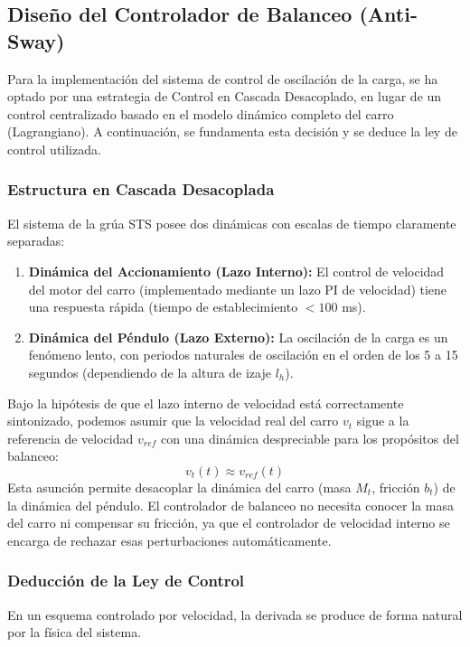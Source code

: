 \documentclass[11pt]{article}                                    %
\begin{document}
\subsection{Diseño del Controlador de Balanceo (Anti-Sway)}
Para la implementación del sistema de control de oscilación de la carga, se ha optado por una estrategia de Control en Cascada Desacoplado, en lugar de un control centralizado basado en el modelo dinámico completo del carro (Lagrangiano). A continuación, se fundamenta esta decisión y se deduce la ley de control utilizada.

\subsubsection{Estructura en Cascada Desacoplada}
El sistema de la grúa STS posee dos dinámicas con escalas de tiempo claramente separadas:
\begin{enumerate}
    \item \textbf{Dinámica del Accionamiento (Lazo Interno):} El control de velocidad del motor del carro (implementado mediante un lazo PI de velocidad) tiene una respuesta rápida (tiempo de establecimiento $< 100$ ms).
    \item \textbf{Dinámica del Péndulo (Lazo Externo):} La oscilación de la carga es un fenómeno lento, con periodos naturales de oscilación en el orden de los 5 a 15 segundos (dependiendo de la altura de izaje $l_h$).
\end{enumerate}

Bajo la hipótesis de que el lazo interno de velocidad está correctamente sintonizado, podemos asumir que la velocidad real del carro $v_t$ sigue a la referencia de velocidad $v_{ref}$ con una dinámica despreciable para los propósitos del balanceo:
\begin{equation}
    v_t(t) \approx v_{ref}(t)
\end{equation}
Esta asunción permite desacoplar la dinámica del carro (masa $M_t$, fricción $b_t$) de la dinámica del péndulo. El controlador de balanceo no necesita conocer la masa del carro ni compensar su fricción, ya que el controlador de velocidad interno se encarga de rechazar esas perturbaciones automáticamente.

\subsubsection{Deducción de la Ley de Control}
En un esquema controlado por velocidad, la derivada se produce de forma natural por la física del sistema.
\end{document}
